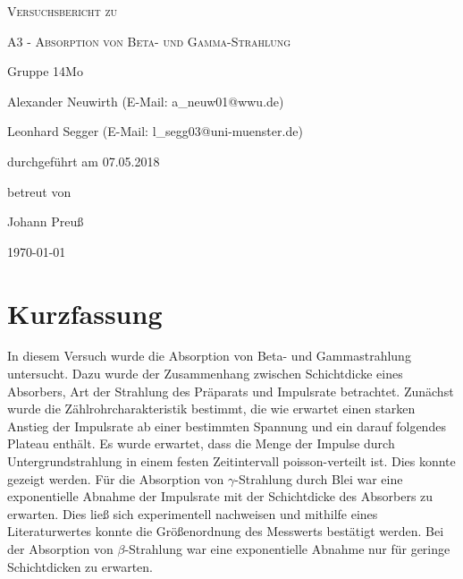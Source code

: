 \documentclass[
	a4paper,
	12pt,
	pagesize,
	ngerman
]{scrartcl}
\begin{document}
	
	\begin{titlepage}
		\centering
		{\scshape\LARGE Versuchsbericht zu \par}
		\vspace{1cm}
		{\scshape\huge A3 - Absorption von Beta- und Gamma-Strahlung \par}
		\vspace{2.5cm}
		{\LARGE Gruppe 14Mo \par}
		\vspace{0.5cm}
		
		{\large Alexander Neuwirth (E-Mail: a\_neuw01@wwu.de) \par}
		{\large Leonhard Segger (E-Mail: l\_segg03@uni-muenster.de) \par}
		\vfill
		
		durchgeführt am 07.05.2018\par
		betreut von\par
		{\large Johann Preuß}  
		
		\vfill
		
		{\large \today\par}
	\end{titlepage}
	\tableofcontents
	\newpage

	\section{Kurzfassung}
	In diesem Versuch wurde die Absorption von Beta- und Gammastrahlung untersucht. %
	Dazu wurde der Zusammenhang zwischen Schichtdicke eines Absorbers, Art der Strahlung des Präparats und Impulsrate betrachtet.
	Zunächst wurde die Zählrohrcharakteristik bestimmt, die wie erwartet einen starken Anstieg der Impulsrate ab einer bestimmten Spannung und ein darauf folgendes Plateau enthält.
	Es wurde erwartet, dass die Menge der Impulse durch Untergrundstrahlung in einem festen Zeitintervall poisson-verteilt ist.
	Dies konnte gezeigt werden.
	Für die Absorption von $\gamma$-Strahlung durch Blei war eine exponentielle Abnahme der Impulsrate mit der Schichtdicke des Absorbers zu erwarten.
	Dies ließ sich experimentell nachweisen und mithilfe eines Literaturwertes konnte die Größenordnung des Messwerts bestätigt werden.
	Bei der Absorption von $\beta$-Strahlung war eine exponentielle Abnahme nur für geringe Schichtdicken zu erwarten.
	
\end{document}
